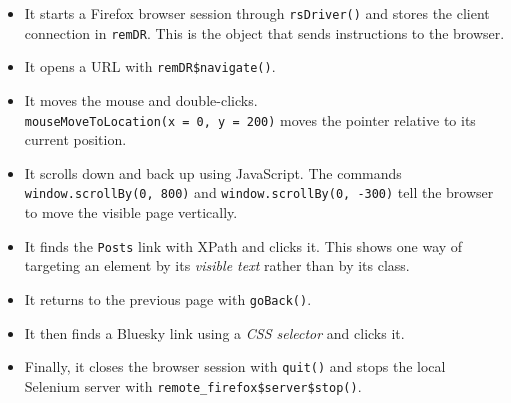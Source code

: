 \documentclass[
  letterpaper,
  DIV=11,
  numbers=noendperiod]{scrreprt}
\begin{document}
\begin{itemize}
\item
  It starts a Firefox browser session through \texttt{rsDriver()} and
  stores the client connection in \texttt{remDR}. This is the object
  that sends instructions to the browser.
\item
  It opens a URL with \texttt{remDR\$navigate()}.
\item
  It moves the mouse and double-clicks.
  \texttt{mouseMoveToLocation(x\ =\ 0,\ y\ =\ 200)} moves the pointer
  relative to its current position.
\item
  It scrolls down and back up using JavaScript. The commands
  \texttt{window.scrollBy(0,\ 800)} and
  \texttt{window.scrollBy(0,\ -300)} tell the browser to move the
  visible page vertically.
\item
  It finds the \texttt{Posts} link with XPath and clicks it. This shows
  one way of targeting an element by its \emph{visible text} rather than
  by its class.
\item
  It returns to the previous page with \texttt{goBack()}.
\item
  It then finds a Bluesky link using a \emph{CSS selector} and clicks
  it.
\item
  Finally, it closes the browser session with \texttt{quit()} and stops
  the local Selenium server with
  \texttt{remote\_firefox\$server\$stop()}.
\end{itemize}
\end{document}
